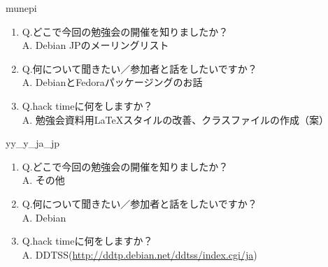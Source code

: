 \begin{prework}{ munepi }
  \begin{enumerate}
  \item Q.どこで今回の勉強会の開催を知りましたか？\\
    A. Debian JPのメーリングリスト
  \item Q.何について聞きたい／参加者と話をしたいですか？\\
    A. DebianとFedoraパッケージングのお話
  \item Q.hack timeに何をしますか？\\
    A. 勉強会資料用\LaTeX スタイルの改善、クラスファイルの作成（案）
  \end{enumerate}
\end{prework}

\begin{prework}{yy\_y\_ja\_jp }
  \begin{enumerate}
  \item Q.どこで今回の勉強会の開催を知りましたか？\\
    A. その他
  \item Q.何について聞きたい／参加者と話をしたいですか？\\
    A. Debian
  \item Q.hack timeに何をしますか？\\
    A. DDTSS(\url{http://ddtp.debian.net/ddtss/index.cgi/ja})
  \end{enumerate}
\end{prework}
